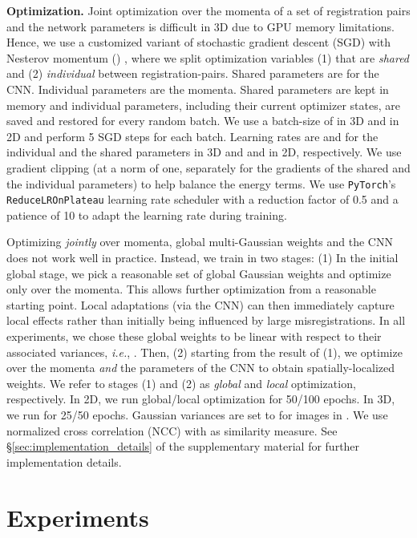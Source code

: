 \documentclass[10pt,twocolumn,letterpaper,table]{article}
\numberwithin{equation}{section}
\theoremstyle{plain}
\theoremstyle{definition}
\def\ie{\emph{i.e.}}  \def\Ie{\emph{I.e.}}
\begin{document}
\noindent
    {\bf Optimization.} Joint optimization over the momenta of a set of registration pairs and the network parameters is difficult in 3D due to GPU memory limitations. Hence, we use a customized variant of stochastic gradient descent (SGD) with Nesterov momentum () \cite{Sutskever13a}, where we split optimization variables (1) that are {\it shared} and (2) {\it individual} between registration-pairs. Shared parameters are for the CNN. Individual parameters are the momenta. Shared parameters are kept in memory and individual parameters, including their current optimizer states, are saved and restored for every random batch. We use a batch-size of  in 3D and  in 2D and perform 5 SGD steps for each batch. 
    Learning rates are  and  for the individual and the shared parameters in 3D and  and  in 2D, respectively. We use gradient clipping (at a norm of one, separately for the gradients of the shared and the individual parameters) to help balance the energy terms. We use \texttt{PyTorch}'s {\tt ReduceLROnPlateau} learning rate scheduler with a reduction factor of 0.5 and a patience of 10 to adapt the learning rate during training. 

     Optimizing \emph{jointly} over momenta, global multi-Gaussian weights and the CNN does not work well in practice. Instead, we train in two stages: (1) In the initial global stage, we pick a reasonable set of global Gaussian weights and optimize only over the momenta. This allows further optimization from a reasonable starting point. Local adaptations (via the CNN) can then immediately capture local effects rather than initially being influenced by large misregistrations. In all  experiments, we chose these global weights to be linear with respect to their associated variances, \ie, . Then, (2) starting from the result of (1), we optimize over the momenta \emph{and} the parameters of the CNN to obtain spatially-localized weights. We refer to stages (1) and (2) as \emph{global} and \emph{local} optimization, respectively. 
      In 2D, we run global/local optimization for 50/100 epochs. In 3D, we run for 25/50 epochs. Gaussian variances are set to  for images in . We use normalized cross correlation (NCC) with  as similarity measure. See \S\ref{sec:implementation_details} of the supplementary material for further implementation details.
\vspace{-0.1cm}

\section{Experiments}
\label{sec:experiments}
\end{document}
